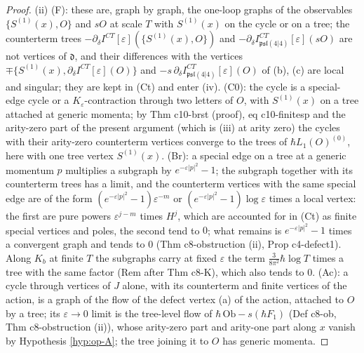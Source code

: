 \documentclass[11pt]{article}
\numberwithin{equation}{section}
\theoremstyle{plain}
\theoremstyle{definition}
\newcommand{\psl}{\mathfrak{psl}(4|4)}
\begin{document}
\begin{proof}
(ii) (F): these are, graph by graph, the one-loop graphs of the observables $\{S^{(1)}(x),O\}$ and $sO$ at scale $T$ with $S^{(1)}(x)$ on the cycle or on a tree; the counterterm trees $-\partial_\delta I^{CT}[\varepsilon](\{S^{(1)}(x),O\})$ and $-\partial_\delta I^{CT}_{\psl}[\varepsilon](sO)$ are not vertices of $\mathfrak d$, and their differences with the vertices $\mp\{S^{(1)}(x),\partial_\delta I^{CT}[\varepsilon](O)\}$ and $-s\,\partial_\delta I^{CT}_{\psl}[\varepsilon](O)$ of (b), (c) are local and singular; they are kept in (Ct) and enter (iv). (C0): the cycle is a special-edge cycle or a $K_\varepsilon$-contraction through two letters of $O$, with $S^{(1)}(x)$ on a tree attached at generic momenta; by Thm c10-brst (proof), eq c10-finitesp and the arity-zero part of the present argument (which is (iii) at arity zero) the cycles with their arity-zero counterterm vertices converge to the trees of $\hbar L_1(O)^{(0)}$, here with one tree vertex $S^{(1)}(x)$. (Br): a special edge on a tree at a generic momentum $p$ multiplies a subgraph by $e^{-\varepsilon|p|^2}-1$; the subgraph together with its counterterm trees has a limit, and the counterterm vertices with the same special edge are of the form $(e^{-\varepsilon|p|^2}-1)\varepsilon^{-m}$ or $(e^{-\varepsilon|p|^2}-1)\log\varepsilon$ times a local vertex: the first are pure powers $\varepsilon^{j-m}$ times $H^j$, which are accounted for in (Ct) as finite special vertices and poles, the second tend to $0$; what remains is $e^{-\varepsilon|p|^2}-1$ times a convergent graph and tends to $0$ (Thm c8-obstruction (ii), Prop c4-defect1). Along $K_b$ at finite $T$ the subgraphs carry at fixed $\varepsilon$ the term $\tfrac3{8\pi^2}\hbar\log T$ times a tree with the same factor (Rem after Thm c8-K), which also tends to $0$. (Ac): a cycle through vertices of $J$ alone, with its counterterm and finite vertices of the action, is a graph of the flow of the defect vertex (a) of the action, attached to $O$ by a tree; its $\varepsilon\to0$ limit is the tree-level flow of $\hbar\,\mathrm{Ob}-s(\hbar F_1)$ (Def c8-ob, Thm c8-obstruction (ii)), whose arity-zero part and arity-one part along $x$ vanish by Hypothesis \ref{hyp:op-A}; the tree joining it to $O$ has generic momenta.


\end{proof}
\end{document}
